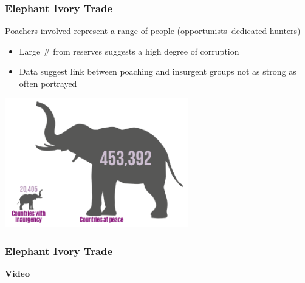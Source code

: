 \documentclass[10pt]{beamer}
\begin{document}
\begin{frame}[t]
\frametitle{Elephant Ivory Trade}
\vspace{0.5cm}

	Poachers involved represent a range of people (opportunists--dedicated hunters)\\
	\medskip
		\begin{itemize}
			\item Large \# from reserves suggests a high degree of corruption\\
			\medskip
			\item Data suggest link between poaching and insurgent groups not as strong as often portrayed\\
		\end{itemize}
	
	\begin{center}
		\includegraphics[width=0.6\textwidth]{figures/ePoaching3.png}
	\end{center}		

\end{frame}


\begin{frame}
\frametitle{Elephant Ivory Trade}

	\begin{center}
		\href{https://www.youtube.com/watch?time_continue=185&v=5gQujyNDp98}{\Large{\textbf{Video}}}	
	\end{center}	

\end{frame}
\end{document}
